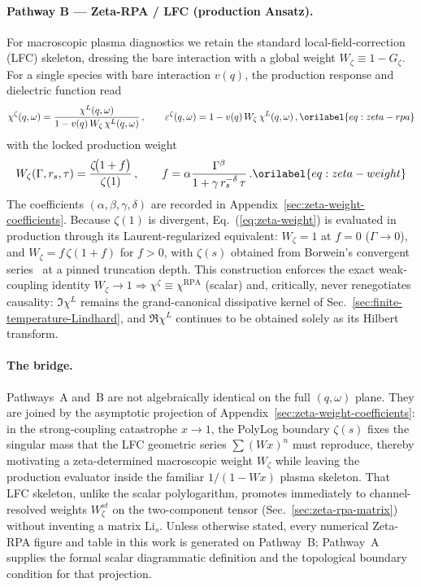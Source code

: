 \documentclass[aps,showkeys,noshowpacs,superscriptaddress,pre,preprint]{revtex4-2}
\let\label\orilabel
\begin{document}
\paragraph{Pathway B --- Zeta-RPA / LFC (production Ansatz).}
For macroscopic plasma diagnostics we retain the standard local-field-correction (LFC) skeleton,
dressing the bare interaction with a global weight $W_\zeta\equiv 1-G_\zeta$.
For a single species with bare interaction $v(q)$, the production response and dielectric function read
\begin{equation}
\chi^{\zeta}(q,\omega)
=
\frac{\chi^L(q,\omega)}{1 - v(q)\,W_\zeta\,\chi^L(q,\omega)}\,,
\qquad
\varepsilon^{\zeta}(q,\omega)
=
1 - v(q)\,W_\zeta\,\chi^L(q,\omega)\,,
\label{eq:zeta-rpa}
\end{equation}
with the locked production weight
\begin{equation}
W_\zeta(\Gamma,r_s,\tau)
=
\frac{\zeta\!\bigl(1+f\bigr)}{\zeta(1)}\,,
\qquad
f
=
\alpha\frac{\Gamma^{\beta}}{1 + \gamma\, r_s^{-\delta}\,\tau}\,.
\label{eq:zeta-weight}
\end{equation}
The coefficients $(\alpha,\beta,\gamma,\delta)$ are recorded in Appendix~\ref{sec:zeta-weight-coefficients}.
Because $\zeta(1)$ is divergent, Eq.~(\ref{eq:zeta-weight}) is evaluated in production through its
Laurent-regularized equivalent: $W_\zeta=1$ at $f=0$ ($\Gamma\to 0$), and
$W_\zeta=f\,\zeta(1+f)$ for $f>0$, with $\zeta(s)$ obtained from Borwein's convergent series~\cite{Edwards2001}
at a pinned truncation depth.
This construction enforces the exact weak-coupling identity
$W_\zeta\to 1\Rightarrow\chi^{\zeta}\equiv\chi^{\mathrm{RPA}}$ (scalar)
and, critically, never renegotiates causality:
$\Im\chi^L$ remains the grand-canonical dissipative kernel of Sec.~\ref{sec:finite-temperature-Lindhard},
and $\Re\chi^L$ continues to be obtained solely as its Hilbert transform.

\paragraph{The bridge.}
Pathways~A and~B are not algebraically identical on the full $(q,\omega)$ plane.
They are joined by the asymptotic projection of Appendix~\ref{sec:zeta-weight-coefficients}:
in the strong-coupling catastrophe $x\to 1$, the PolyLog boundary $\zeta(s)$ fixes the singular mass that the LFC geometric series $\sum(Wx)^n$ must reproduce, thereby motivating a zeta-determined macroscopic weight $W_\zeta$ while leaving the production evaluator inside the familiar $1/(1-Wx)$ plasma skeleton.
That LFC skeleton, unlike the scalar polylogarithm, promotes immediately to channel-resolved weights $W_\zeta^{st}$ on the two-component tensor (Sec.~\ref{sec:zeta-rpa-matrix}) without inventing a matrix $\mathrm{Li}_s$.
Unless otherwise stated, every numerical Zeta-RPA figure and table in this work is generated on Pathway~B; Pathway~A supplies the formal scalar diagrammatic definition and the topological boundary condition for that projection.
\end{document}
